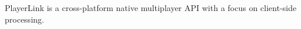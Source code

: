 Player\+Link is a cross-\/platform native multiplayer A\+PI with a focus on client-\/side processing. 